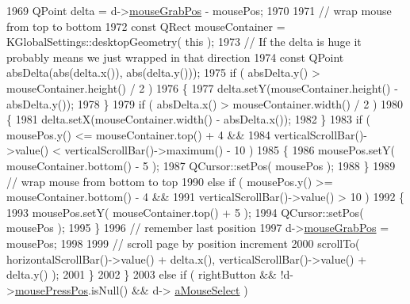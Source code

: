 \begin{DoxyCode}
1969                     QPoint delta = d->\hyperlink{classPageViewPrivate_aa02b40a75cef0ee7f1b423027a80c8d6}{mouseGrabPos} - mousePos;
1970 
1971                     \textcolor{comment}{// wrap mouse from top to bottom}
1972                     \textcolor{keyword}{const} QRect mouseContainer = KGlobalSettings::desktopGeometry( \textcolor{keyword}{this} );
1973                     \textcolor{comment}{// If the delta is huge it probably means we just wrapped in that direction}
1974                     \textcolor{keyword}{const} QPoint absDelta(abs(delta.x()), abs(delta.y()));
1975                     \textcolor{keywordflow}{if} ( absDelta.y() > mouseContainer.height() / 2 )
1976                     \{
1977                         delta.setY(mouseContainer.height() - absDelta.y());
1978                     \}
1979                     \textcolor{keywordflow}{if} ( absDelta.x() > mouseContainer.width() / 2 )
1980                     \{
1981                         delta.setX(mouseContainer.width() - absDelta.x());
1982                     \}
1983                     \textcolor{keywordflow}{if} ( mousePos.y() <= mouseContainer.top() + 4 &&
1984                          verticalScrollBar()->value() < verticalScrollBar()->maximum() - 10 )
1985                     \{
1986                         mousePos.setY( mouseContainer.bottom() - 5 );
1987                         QCursor::setPos( mousePos );
1988                     \}
1989                     \textcolor{comment}{// wrap mouse from bottom to top}
1990                     \textcolor{keywordflow}{else} \textcolor{keywordflow}{if} ( mousePos.y() >= mouseContainer.bottom() - 4 &&
1991                               verticalScrollBar()->value() > 10 )
1992                     \{
1993                         mousePos.setY( mouseContainer.top() + 5 );
1994                         QCursor::setPos( mousePos );
1995                     \}
1996                     \textcolor{comment}{// remember last position}
1997                     d->\hyperlink{classPageViewPrivate_aa02b40a75cef0ee7f1b423027a80c8d6}{mouseGrabPos} = mousePos;
1998 
1999                     \textcolor{comment}{// scroll page by position increment}
2000                     scrollTo( horizontalScrollBar()->value() + delta.x(), verticalScrollBar()->value() + 
      delta.y() );
2001                 \}
2002             \}
2003             \textcolor{keywordflow}{else} \textcolor{keywordflow}{if} ( rightButton && !d->\hyperlink{classPageViewPrivate_aa4799ae3aa24957d19a95220d8f61216}{mousePressPos}.isNull() && d->
      \hyperlink{classPageViewPrivate_a9e809032b95484f491dd439198b7bb8e}{aMouseSelect} )

\end{DoxyCode}
